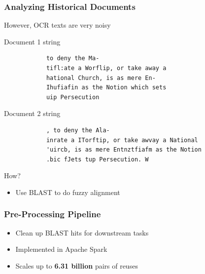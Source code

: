 \documentclass[pdf]{beamer}
\begin{document}
\begin{frame}[fragile]
    \frametitle{Analyzing Historical Documents}


        However, OCR texts are very noisy
        \begin{block}{Document 1 string}
            \footnotesize
            \begin{verbatim}
            to deny the Ma-
            tifl:ate a Worflip, or take away a
            hational Church, is as mere En-
            Ihufiafin as the Notion which sets
            uip Persecution    
            \end{verbatim}
        \end{block}    
        \begin{block}{Document 2 string}
            \footnotesize
            \begin{verbatim}
            , to deny the Ala-
            inrate a ITorftip, or take awvay a National
            'uircb, is as mere Entnztfiafm as the Notion
            .bic fJets tup Persecution. W
            \end{verbatim}
        \end{block}    
        How?
        \begin{itemize}
            \item Use BLAST to do fuzzy alignment
        \end{itemize}
\end{frame}

\begin{frame}[fragile]
    \frametitle{Pre-Processing Pipeline}
    \scalebox{0.5}{
    
    }
    \begin{itemize}
        \item Clean up BLAST hits for downstream tasks
        \item Implemented in Apache Spark
        \item Scales up to {\bf 6.31 billion} pairs of reuses
    \end{itemize}
\end{frame}
\end{document}
